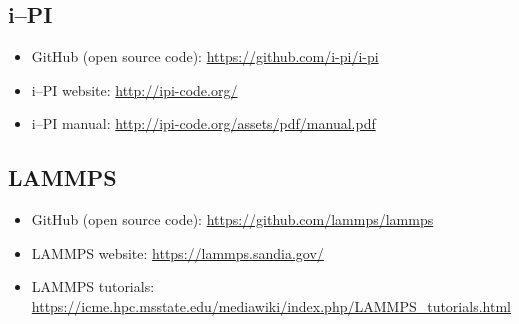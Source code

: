 \documentclass[12pt]{article}
\begin{document}
\subsection{i--PI}
\begin{itemize}
    \item GitHub (open source code): \url{https://github.com/i-pi/i-pi}
    \item i--PI website: \url{http://ipi-code.org/}
    \item i--PI manual: \url{http://ipi-code.org/assets/pdf/manual.pdf}
\end{itemize}
\subsection{LAMMPS}
\begin{itemize}
    \item GitHub (open source code): \url{https://github.com/lammps/lammps}
    \item LAMMPS website: \url{https://lammps.sandia.gov/}
    \item LAMMPS tutorials: \url{https://icme.hpc.msstate.edu/mediawiki/index.php/LAMMPS_tutorials.html}
\end{itemize}
\end{document}

